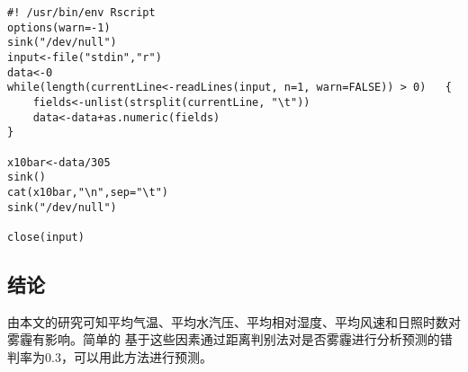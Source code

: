 \begin{lstlisting}
#! /usr/bin/env Rscript
options(warn=-1)
sink("/dev/null")
input<-file("stdin","r")
data<-0
while(length(currentLine<-readLines(input, n=1, warn=FALSE)) > 0)   {
    fields<-unlist(strsplit(currentLine, "\t"))
    data<-data+as.numeric(fields)
}

x10bar<-data/305
sink()
cat(x10bar,"\n",sep="\t")
sink("/dev/null")

close(input)
\end{lstlisting}

\subsection{结论}\label{ux7ed3ux8bba}

由本文的研究可知平均气温、平均水汽压、平均相对湿度、平均风速和日照时数对雾霾有影响。简单的
基于这些因素通过距离判别法对是否雾霾进行分析预测的错判率为0.3，可以用此方法进行预测。
